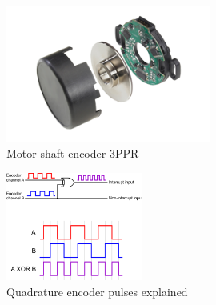 \documentclass[12pt]{article}
\begin{document}
\begin{itemize}
	\begin{figure}[H]
		\centering
		\includegraphics[width =0.6\textwidth]{Fig/Electronics/encoder.png}
		\caption{Motor shaft encoder 3PPR}
		\label{fig:encoder}
	\end{figure}
	
	\begin{figure}[H]
		\centering
		\includegraphics[width =0.4\textwidth]{Fig/Electronics/encoder-pulses.png}
		\caption{Quadrature encoder pulses explained}
		\label{fig:encoder-pulses}
	\end{figure}


\end{itemize}
\end{document}

